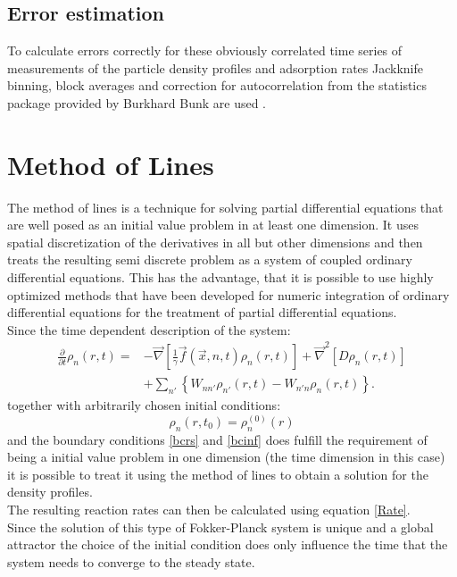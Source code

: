\subsection{Error estimation}
To calculate errors correctly for these obviously correlated time series of measurements of the particle density profiles and adsorption rates Jackknife binning, block averages and correction for autocorrelation from the statistics package provided by Burkhard Bunk are used \cite{bunk2006}.
\newpage
\section{Method of Lines}
\label{method_of_lines}
The method of lines \cite{pregla1989, saucez2001} is a technique for solving partial differential equations that are well posed as an initial value problem in at least one dimension. It uses spatial discretization of the derivatives in all but other dimensions and then treats the resulting semi discrete problem as a system of coupled ordinary differential equations. This has the advantage, that it is possible to use highly optimized methods that have been developed for numeric integration of ordinary differential equations for the treatment of partial differential equations.\\
Since the time dependent description of the system: 
\begin{align}
    \frac{\partial}{\partial t } \rho_n(r,t) =   &- \vec{ \nabla } \left[\frac{1}{\gamma}\vec{f}(\vec{x},n,t)\rho_n(r,t) \right] +\vec{\nabla}^{2}\left[ D\rho_n(r,t) \right] \nonumber \\
    &+ \sum_{n'} \left\{ W_{nn'}\rho_{n'}(r,t) - W_{n'n}\rho_n(r,t)\right\}.
    \label{fpmeqmol}
\end{align}
together with arbitrarily chosen initial conditions:
\begin{equation}
    \rho_n(r,t_0) = \rho_n^{(0)}(r)
    \label{rho0mol}
\end{equation}
and the boundary conditions \eqref{bcrs} and \eqref{bcinf} does fulfill the requirement of being a initial value problem in one dimension (the time dimension in this case) it is possible to treat it using the method of lines to obtain a solution for the density profiles.\\
The resulting reaction rates can then be calculated using equation \eqref{Rate}.\\
Since the solution of this type of Fokker-Planck system is unique \cite{soize1994} and a global attractor \cite{Efendiev2000} the choice of the initial condition does only influence the time that the system needs to converge to the steady state.\\
